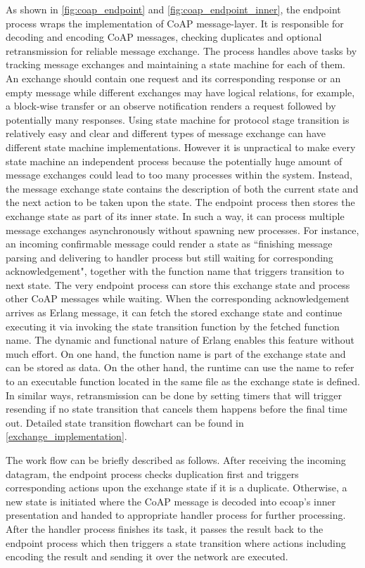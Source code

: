 As shown in \autoref{fig:coap_endpoint} and \autoref{fig:coap_endpoint_inner}, the endpoint process wraps the implementation of CoAP message-layer. It is responsible for decoding and encoding CoAP messages, checking duplicates and optional retransmission for reliable message exchange. The process handles above tasks by tracking message exchanges and maintaining a state machine for each of them. An exchange should contain one request and its corresponding response or an empty message while different exchanges may have logical relations, for example, a block-wise transfer or an observe notification renders a request followed by potentially many responses. Using state machine for protocol stage transition is relatively easy and clear and different types of message exchange can have different state machine implementations. However it is unpractical to make every state machine an independent process because the potentially huge amount of message exchanges could lead to too many processes within the system. Instead, the message exchange state contains the description of both the current state and the next action to be taken upon the state. The endpoint process then stores the exchange state as part of its inner state. In such a way, it can process multiple message exchanges asynchronously without spawning new processes. For instance, an incoming confirmable message could render a state as ``finishing message parsing and delivering to handler process but still waiting for corresponding acknowledgement", together with the function name that triggers transition to next state. The very endpoint process can store this exchange state and process other CoAP messages while waiting. When the corresponding acknowledgement arrives as Erlang message, it can fetch the stored exchange state and continue executing it via invoking the state transition function by the fetched function name. The dynamic and functional nature of Erlang enables this feature without much effort. On one hand, the function name is part of the exchange state and can be stored as data. On the other hand, the runtime can use the name to refer to an executable function located in the same file as the exchange state is defined. In similar ways, retransmission can be done by setting timers that will trigger resending if no state transition that cancels them happens before the final time out. Detailed state transition flowchart can be found in \autoref{exchange_implementation}.

The work flow can be briefly described as follows. After receiving the incoming datagram, the endpoint process checks duplication first and triggers corresponding actions upon the exchange state if it is a duplicate. Otherwise, a new state is initiated where the CoAP message is decoded into ecoap's inner presentation and handed to appropriate handler process for further processing. After the handler process finishes its task, it passes the result back to the endpoint process which then  triggers a state transition where actions including encoding the result and sending it over the network are executed.

